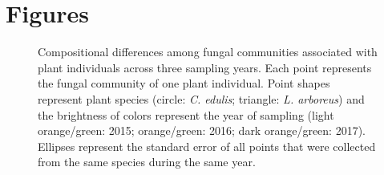 %
%



\newpage
\section{Figures}
\begin{figure}[h]
	\centering
	\caption[Compositional differences among fungal communities associated with plant individuals across three sampling years.]
		{\hspace{1mm} Compositional differences among fungal communities associated with plant individuals across three sampling years. Each point represents the fungal community of one plant individual. Point shapes represent plant species (circle: \textit{C. edulis}; triangle: \textit{L. arboreus}) and the brightness of colors represent the year of sampling (light orange/green: 2015; orange/green: 2016; dark orange/green: 2017). Ellipses represent the standard error of all points that were collected from the same species during the same year. 
		}
	\label{fig:3YrNMDS_Individual}
\end{figure}



